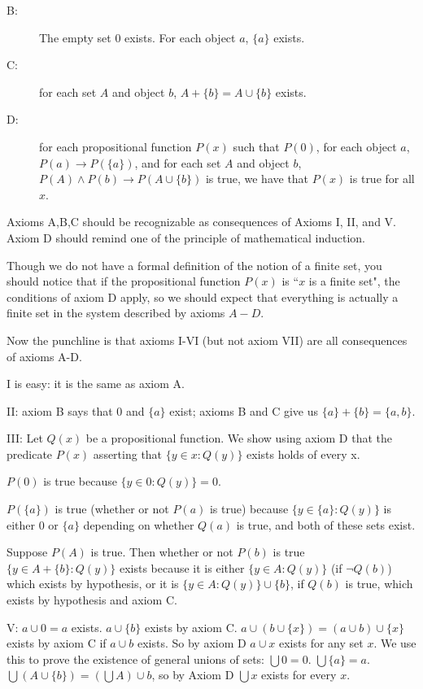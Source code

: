 \documentclass[12pt]{article}
\begin{document}
\begin{enumerate}
\begin{description}
\begin{description}
\item[B:]  The empty set 0 exists.  For each object $a$, $\{a\}$ exists.

\item[C:]  for each set $A$ and object $b$, $A + \{b\} = A \cup \{b\}$ exists.

\item[D:]  for each propositional function $P(x)$ such that $P(0)$, for each object $a$, $P(a) \rightarrow P(\{a\})$, and for each set $A$ and object $b$,
$P(A) \wedge P(b) \rightarrow P(A \cup \{b\})$ is true, we have that $P(x)$ is true for all $x$.

\end{description}

Axioms A,B,C should be recognizable as consequences of Axioms I, II, and V.  Axiom D should remind one of the principle of mathematical induction.

Though we do not have a formal definition of the notion of a finite set, you should notice that if the propositional function $P(x)$ is ``$x$ is a finite set",
the conditions of axiom D apply, so we should expect that everything is actually a finite set in the system described by axioms $A-D$.

Now the punchline is that axioms I-VI (but not axiom VII) are all consequences of axioms A-D.

I is easy:  it is the same as axiom A.

II:  axiom B says that 0 and $\{a\}$ exist;  axioms B and C give us $\{a\}+\{b\} = \{a,b\}$.

III:  Let $Q(x)$ be a propositional function.  We show using axiom D that the predicate $P(x)$ asserting that $\{y \in x:Q(y)\}$ exists holds of every x.

$P(0)$ is true because $\{y \in 0:Q(y)\} = 0$.

$P(\{a\})$ is true (whether or not $P(a)$ is true) because $\{y \in \{a\}:Q(y)\}$ is either 0 or $\{a\}$ depending on whether $Q(a)$ is true,
and both of these sets exist.

Suppose $P(A)$ is true.  Then whether or not $P(b)$ is true $\{y \in A + \{b\}:Q(y)\}$ exists because it is either $\{y \in A:Q(y)\}$ (if $\neg Q(b)$) which
exists by hypothesis, or it is $\{y \in A:Q(y)\} \cup \{b\}$, if $Q(b)$ is true, which exists by hypothesis and axiom C.

V:  $a \cup 0 = a$ exists.  $a \cup \{b\}$ exists by axiom C.  $a \cup (b \cup \{x\}) = (a\cup b) \cup \{x\}$ exists by axiom C if $a \cup b$ exists.  So by axiom D
$a \cup x$ exists for any set $x$.  We use this to prove the existence of general unions of sets:
$\bigcup 0=0$.  $\bigcup \{a\} = a$.  $\bigcup (A \cup \{b\}) = (\bigcup A) \cup b$, so by Axiom D $\bigcup x$ exists for every $x$.


\end{description}
\end{enumerate}
\end{document}
